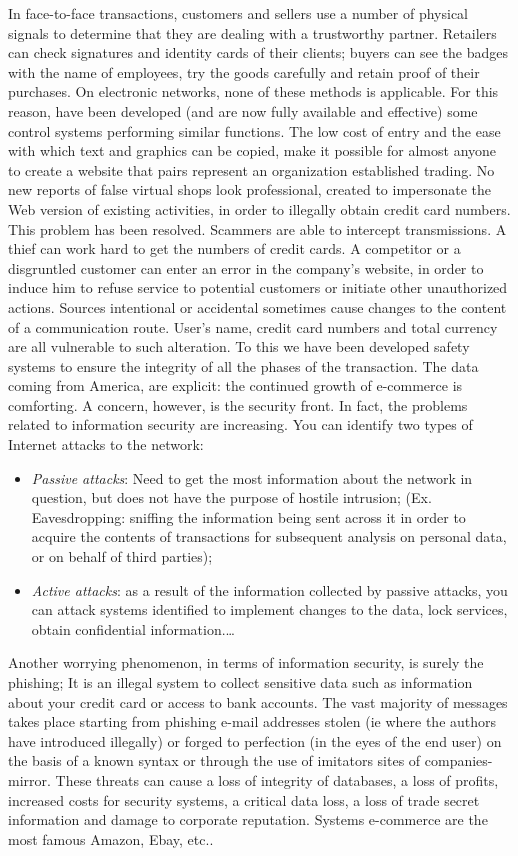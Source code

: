 In face-to-face transactions, customers and sellers use a number of physical signals to determine that they are dealing with a trustworthy partner. Retailers can check signatures and identity cards of their clients; buyers can see the badges with the name of employees, try the goods carefully and retain proof of their purchases. On electronic networks, none of these methods is applicable. For this reason, have been developed (and are now fully available and effective) some control systems performing similar functions.
The low cost of entry and the ease with which text and graphics can be copied, make it possible for almost anyone to create a website that pairs represent an organization established trading. No new reports of false virtual shops look professional, created to impersonate the Web version of existing activities, in order to illegally obtain credit card numbers. This problem has been resolved. Scammers are able to intercept transmissions. A thief can work hard to get the numbers of credit cards. A competitor or a disgruntled customer can enter an error in the company's website, in order to induce him to refuse service to potential customers or initiate other unauthorized actions. Sources intentional or accidental sometimes cause changes to the content of a communication route. User's name, credit card numbers and total currency are all vulnerable to such alteration. To this we have been developed safety systems to ensure the integrity of all the phases of the transaction. The data coming from America, are explicit: the continued growth of e-commerce is comforting. A concern, however, is the security front. In fact, the problems related to information security are increasing.
\newline
You can identify two types of Internet attacks to the network:
\begin{itemize}
  \item \emph{Passive attacks}: Need to get the most information about the network in question, but does not have the purpose of hostile intrusion; (Ex. Eavesdropping: sniffing the information being sent across it in order to acquire the contents of transactions for subsequent analysis on personal data, or on behalf of third parties);
  \item \emph{Active attacks}: as a result of the information collected by passive attacks, you can attack systems identified to implement changes to the data, lock services, obtain confidential information.\ldots
\end{itemize}
Another worrying phenomenon, in terms of information security, is
surely the phishing; It is an illegal system to collect sensitive data such as information about your credit card or access to bank accounts. The vast majority of messages takes place starting from phishing e-mail addresses stolen (ie where the authors have introduced illegally) or forged to perfection (in the eyes of the end user) on the basis of a known syntax or through the use of imitators sites of companies-mirror. These threats can cause a loss of integrity of databases, a loss of profits, increased costs for security systems, a critical data loss, a loss of trade secret information and damage to corporate reputation.
Systems e-commerce are the most famous Amazon, Ebay, etc..

